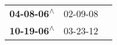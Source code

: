 \begin{supertabular}{lll}
 \textbf{04-08-06\textsuperscript{$\wedge$}} &  02-09-08\textsuperscript{} \\
 \textbf{10-19-06\textsuperscript{$\wedge$}} &  03-23-12\textsuperscript{} \\
\end{supertabular}
